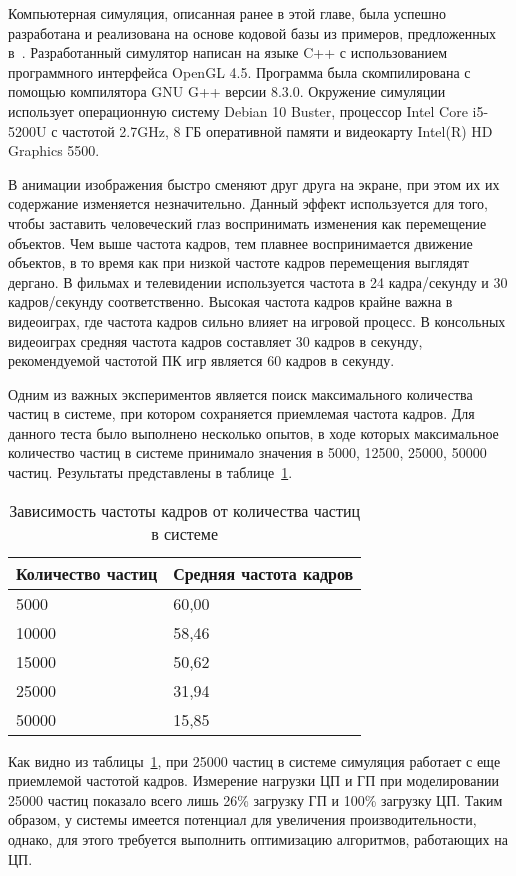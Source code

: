 Компьютерная симуляция, описанная ранее в этой главе, была
успешно разработана и реализована на основе кодовой базы из примеров,
предложенных в~\cite{LearnOGL}. Разработанный симулятор написан на языке C++ с
использованием программного интерфейса OpenGL 4.5. Программа была скомпилирована
с помощью компилятора GNU G++ версии 8.3.0. Окружение симуляции использует
операционную систему Debian 10 Buster, процессор Intel Core i5-5200U с частотой
2.7GHz, 8 ГБ оперативной памяти и видеокарту Intel(R) HD Graphics 5500.

В анимации изображения быстро сменяют друг друга на экране, при этом их их
содержание изменяется незначительно. Данный эффект используется для того, чтобы
заставить человеческий глаз воспринимать изменения как перемещение объектов. Чем
выше частота кадров, тем плавнее воспринимается движение объектов, в то время
как при низкой частоте кадров перемещения выглядят дергано. В фильмах и
телевидении используется частота в 24 кадра/секунду и 30 кадров/секунду
соответственно. Высокая частота кадров крайне важна в видеоиграх, где частота
кадров сильно влияет на игровой процесс. В консольных видеоиграх средняя частота
кадров составляет 30 кадров в секунду, рекомендуемой частотой ПК игр является 60
кадров в секунду.

Одним из важных экспериментов является поиск максимального количества частиц в
системе, при котором сохраняется приемлемая частота кадров. Для данного теста
было выполнено несколько опытов, в ходе которых максимальное количество частиц в
системе принимало значения в 5000, 12500, 25000, 50000 частиц. Результаты
представлены в таблице~\ref{table:amountBench}.
\begin{table}[htb]
\caption{Зависимость частоты кадров от количества частиц в системе}%
\label{table:amountBench}
\centering
\small
\begin{tabular}{| l | l |}
    \hline
    Количество частиц & Средняя частота кадров \\
    \hline
    5000 &  60,00 \\
    \hline
    10000 & 58,46 \\
    \hline
    15000 & 50,62 \\
    \hline
    25000 & 31,94 \\
    \hline
    50000 & 15,85 \\
    \hline
\end{tabular}
\end{table}

Как видно из таблицы~\ref{table:amountBench}, при 25000 частиц в системе
симуляция работает с еще приемлемой частотой кадров. Измерение нагрузки ЦП и ГП
при моделировании 25000 частиц показало всего лишь 26\% загрузку ГП и 100\%
загрузку ЦП. Таким образом, у системы имеется потенциал для увеличения
производительности, однако, для этого требуется выполнить оптимизацию
алгоритмов, работающих на ЦП.

